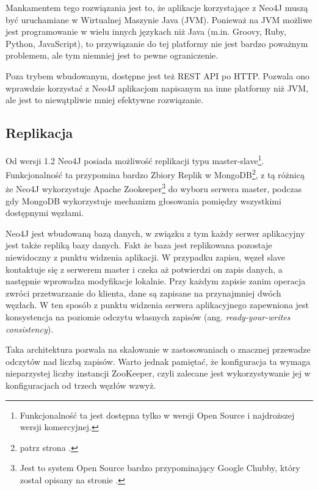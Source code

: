 Mankamentem tego rozwiązania jest to, że aplikacje korzystające z Neo4J muszą być uruchamiane w Wirtualnej Maszynie Java (JVM).
Ponieważ na JVM możliwe jest programowanie w wielu innych językach niż Java (m.in. Groovy, Ruby, Python, JavaScript), to przywiązanie do tej platformy nie jest bardzo poważnym problemem, ale tym niemniej jest to pewne ograniczenie.

Poza trybem wbudowanym, dostępne jest też REST API po HTTP.
Pozwala ono wprawdzie korzystać z Neo4J aplikacjom napisanym na inne platformy niż JVM, ale jest to niewątpliwie mniej efektywne rozwiązanie.

\subsection*{Replikacja}


Od wersji 1.2 Neo4J posiada możliwość replikacji typu master-slave\footnote{Funkcjonalność ta jest dostępna tylko w wersji Open Source i najdroższej wersji komercyjnej.}.
Funkcjonalność ta przypomina bardzo Zbiory Replik w MongoDB\footnote{patrz strona \pageref{sec:mongodb-replication}.}, z tą różnicą że Neo4J wykorzystuje Apache Zookeeper\footnote{Jest to system Open Source bardzo przypominający Google Chubby, który został opisany na stronie \pageref{sec:google-chubby}.} do wyboru serwera master, podczas gdy MongoDB wykorzystuje mechanizm głosowania pomiędzy wszystkimi dostępnymi węzłami.

Neo4J jest wbudowaną bazą danych, w związku z tym każdy serwer aplikacyjny jest także repliką bazy danych.
Fakt że baza jest replikowana pozostaje niewidoczny z punktu widzenia aplikacji.
W przypadku zapisu, węzeł slave kontaktuje się z serwerem master i czeka aż potwierdzi on zapis danych, a następnie wprowadza modyfikacje lokalnie.
Przy każdym zapisie zanim operacja zwróci przetwarzanie do klienta, dane są zapisane na przynajmniej dwóch węzłach.
W ten sposób z punktu widzenia serwera aplikacyjnego zapewniona jest konsystencja na poziomie odczytu własnych zapisów (ang. \emph{ready-your-writes consistency}).

Taka architektura pozwala na skalowanie w zastosowaniach o znacznej przewadze odczytów nad liczbą zapisów.
Warto jednak pamiętać, że konfiguracja ta wymaga nieparzystej liczby instancji ZooKeeper, czyli zalecane jest wykorzystywanie jej w konfiguracjach od trzech węzłów wzwyż.

